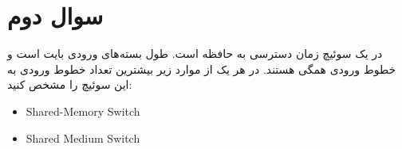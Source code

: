 \section{سوال دوم}

در یک سوئیچ  زمان دسترسی به حافظه  است. طول بسته‌های ورودی  بایت است و خطوط ورودی همگی  هستند. در هر یک از موارد زیر بیشترین تعداد خطوط ورودی به این سوئیچ را مشخص کنید:

\begin{latin}
	\begin{itemize}
		\item Shared-Memory Switch
		\item Shared Medium Switch
	\end{itemize}
\end{latin}